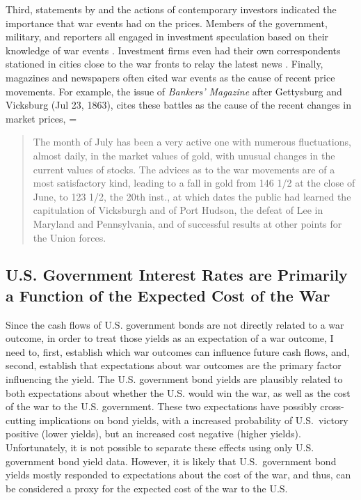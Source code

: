 Third, statements by and the actions of contemporary investors indicated the importance that war events had on the prices. %
Members of the government, military, and reporters all engaged in investment speculation based on their knowledge of war events \parencites[5-7]{Cornwallis1879}{Mitchell1903}[][1004]{WillardGuinnaneEtAl1996}.
Investment firms even had their own correspondents stationed in cities close to the war fronts to relay the latest news \parencites[5-7]{Cornwallis1879}. %
Finally, magazines and newspapers often cited war events as the cause of recent price movements. %
For example, the issue of \textit{Bankers' Magazine} after Gettysburg and Vicksburg (Jul 23, 1863), cites these battles as the cause of the recent changes in market prices,
=\begin{quote}
  The month of July has been a very active one with numerous fluctuations, almost daily, in the market values of gold, with unusual changes in the current values of stocks. %
  The advices as to the war movements are of a most satisfactory kind, leading to a fall in gold from 146 1/2 at the close of June, to 123 1/2, the 20th inst., at which dates the public had learned the  capitulation of Vicksburgh and of Port Hudson, the defeat of Lee in  Maryland and Pennsylvania, and of successful results at other points  for the Union forces. %
\parencite[159]{BankersMagazine1864}
\end{quote}



\subsection{U.S. Government Interest Rates are Primarily a Function of the Expected Cost of the War}
\label{sec:u.s.-governm-inter}

Since the cash flows of U.S. government bonds are not directly related to a war outcome, in order to treat those yields as an expectation of a war outcome, I need to, first, establish which war outcomes can influence future cash flows, and, second, establish that expectations about war outcomes are the primary factor influencing the yield.
The U.S. government bond yields are plausibly related to both expectations about whether the U.S. would win the war, as well as the cost of the war to the U.S. government.
These two expectations have possibly cross-cutting implications on bond yields, with a increased probability of U.S.\ victory positive (lower yields), but an increased cost negative (higher yields).
Unfortunately, it is not possible to separate these effects using only U.S. government bond yield data.
However, it is likely that U.S.\ government bond yields mostly responded to expectations about the cost of the war, and thus, can be considered a proxy for the expected cost of the war to the U.S.

